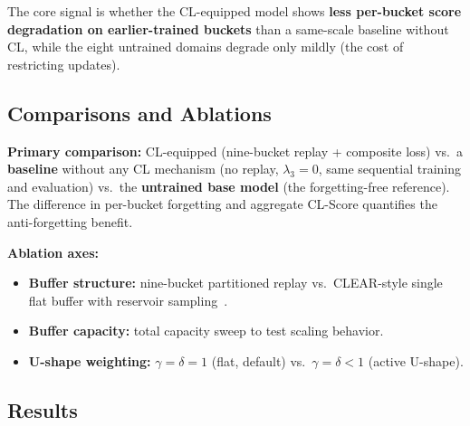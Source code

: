 The core signal is whether the CL-equipped model shows \textbf{less per-bucket score degradation on earlier-trained buckets} than a same-scale baseline without CL, while the eight untrained domains degrade only mildly (the cost of restricting updates).

\subsection{Comparisons and Ablations}

\textbf{Primary comparison:} CL-equipped (nine-bucket replay + composite loss) vs.\ a \textbf{baseline} without any CL mechanism (no replay, $\lambda_3=0$, same sequential training and evaluation) vs.\ the \textbf{untrained base model} (the forgetting-free reference). The difference in per-bucket forgetting and aggregate CL-Score quantifies the anti-forgetting benefit.

\textbf{Ablation axes:}
\begin{itemize}
  \item \textbf{Buffer structure:} nine-bucket partitioned replay vs.\ CLEAR-style single flat buffer with reservoir sampling~\cite{A2}.
  \item \textbf{Buffer capacity:} total capacity sweep to test scaling behavior.
  \item \textbf{U-shape weighting:} $\gamma=\delta=1$ (flat, default) vs.\ $\gamma=\delta<1$ (active U-shape).
\end{itemize}

\subsection{Results}


